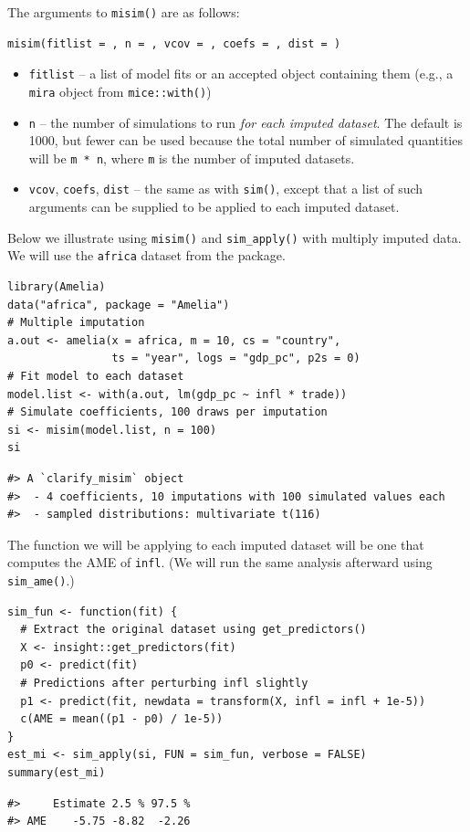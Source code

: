The arguments to \texttt{misim()} are as follows:
\begin{verbatim}
misim(fitlist = , n = , vcov = , coefs = , dist = )
\end{verbatim}
\begin{itemize}
\item
  \texttt{fitlist} -- a list of model fits or an accepted object containing them (e.g., a \texttt{mira} object from \texttt{mice::with()})
\item
  \texttt{n} -- the number of simulations to run \emph{for each imputed dataset}. The default is 1000, but fewer can be used because the total number of simulated quantities will be \texttt{m\ *\ n}, where \texttt{m} is the number of imputed datasets.
\item
  \texttt{vcov}, \texttt{coefs}, \texttt{dist} -- the same as with \texttt{sim()}, except that a list of such arguments can be supplied to be applied to each imputed dataset.
\end{itemize}
Below we illustrate using \texttt{misim()} and \texttt{sim\_apply()} with multiply imputed data. We will use the \texttt{africa} dataset from the  package.
\begin{verbatim}
library(Amelia)
data("africa", package = "Amelia")
# Multiple imputation
a.out <- amelia(x = africa, m = 10, cs = "country",
                ts = "year", logs = "gdp_pc", p2s = 0)
# Fit model to each dataset
model.list <- with(a.out, lm(gdp_pc ~ infl * trade))
# Simulate coefficients, 100 draws per imputation
si <- misim(model.list, n = 100)
si
\end{verbatim}
\begin{verbatim}
#> A `clarify_misim` object
#>  - 4 coefficients, 10 imputations with 100 simulated values each
#>  - sampled distributions: multivariate t(116)
\end{verbatim}
The function we will be applying to each imputed dataset will be one that computes the AME of \texttt{infl}. (We will run the same analysis afterward using \texttt{sim\_ame()}.)
\begin{verbatim}
sim_fun <- function(fit) {
  # Extract the original dataset using get_predictors()
  X <- insight::get_predictors(fit)
  p0 <- predict(fit)
  # Predictions after perturbing infl slightly
  p1 <- predict(fit, newdata = transform(X, infl = infl + 1e-5))
  c(AME = mean((p1 - p0) / 1e-5))
}
est_mi <- sim_apply(si, FUN = sim_fun, verbose = FALSE)
summary(est_mi)
\end{verbatim}
\begin{verbatim}
#>     Estimate 2.5 % 97.5 %
#> AME    -5.75 -8.82  -2.26
\end{verbatim}
